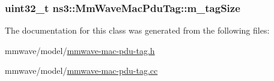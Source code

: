 \subsubsection[{\texorpdfstring{m\+\_\+tag\+Size}{m_tagSize}}]{\setlength{\rightskip}{0pt plus 5cm}uint32\+\_\+t ns3\+::\+Mm\+Wave\+Mac\+Pdu\+Tag\+::m\+\_\+tag\+Size\hspace{0.3cm}{\ttfamily [protected]}}\hypertarget{classns3_1_1MmWaveMacPduTag_ae859a2d504af32add4b7cc8cc14b496b}{}\label{classns3_1_1MmWaveMacPduTag_ae859a2d504af32add4b7cc8cc14b496b}


The documentation for this class was generated from the following files\+:\begin{DoxyCompactItemize}
\item 
mmwave/model/\hyperlink{mmwave-mac-pdu-tag_8h}{mmwave-\/mac-\/pdu-\/tag.\+h}\item 
mmwave/model/\hyperlink{mmwave-mac-pdu-tag_8cc}{mmwave-\/mac-\/pdu-\/tag.\+cc}\end{DoxyCompactItemize}
